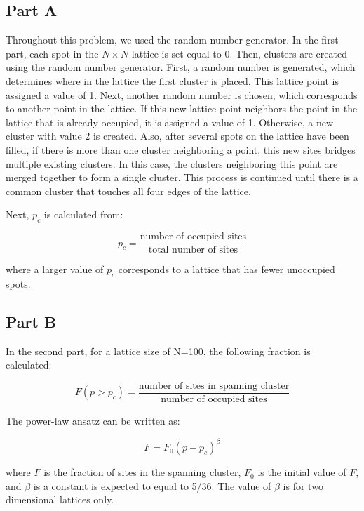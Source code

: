 \documentclass[12pt]{article}
\begin{document}
\subsection{Part A}
\indent \indent Throughout this problem, we used the random number generator.
 In the first part, each spot in the $N \times N$ lattice is set equal to 0. Then, clusters are created using the random number generator. First, a random number is generated, which determines where in the lattice the first cluster is placed. This lattice point is assigned a value of 1. Next, another random number is chosen, which corresponds to another point in the lattice. If this new lattice point neighbors the point in the lattice that is already occupied, it is assigned a value of 1. Otherwise, a new cluster with value 2 is created.  \newline
 \indent Also, after several spots on the lattice have been filled, if there is more than one cluster neighboring a point, this new sites bridges multiple existing clusters. In this case, the clusters neighboring this point are merged together to form a single cluster. This process is continued until there is a common cluster that touches all four edges of the lattice. \newline
 
\indent Next, $p_c$ is calculated from:

\begin{equation}
	p_c=\frac{\text{number of occupied sites}}{\text{total number of sites}}
\end{equation}

\indent where a larger value of $p_c$ corresponds to a lattice that has fewer unoccupied spots.

\subsection{Part B}
\indent \indent In the second part, for a lattice size of N=100, the following fraction is calculated:

\begin{equation}
F(p>p_c)=\frac{\text{number of sites in spanning cluster}}{\text{number of occupied sites}}
\end{equation}

\indent The power-law ansatz can be written as:

\begin{equation}
F=F_0(p-p_c)^\beta
\end{equation}

where $F$ is the fraction of sites in the spanning cluster, $F_0$ is the initial value of $F$, and $\beta$ is a constant is expected to equal to 5/36. The value of $\beta$ is for two dimensional lattices only.\newline
\end{document}
